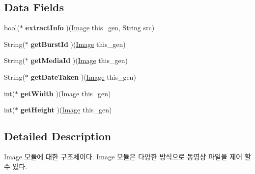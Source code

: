 \subsection*{Data Fields}
\begin{DoxyCompactItemize}
\item 
\hypertarget{struct__Image_abc38422f15a135e8d3d488fd17404a11}{bool($\ast$ {\bfseries extract\-Info} )(\hyperlink{struct__Image}{Image} this\-\_\-gen, String src)}\label{struct__Image_abc38422f15a135e8d3d488fd17404a11}

\item 
\hypertarget{struct__Image_a43ccbbf065326a2647887464f16b7373}{String($\ast$ {\bfseries get\-Burst\-Id} )(\hyperlink{struct__Image}{Image} this\-\_\-gen)}\label{struct__Image_a43ccbbf065326a2647887464f16b7373}

\item 
\hypertarget{struct__Image_a3ebc4a1fcad891955f6bd315dbf79b87}{String($\ast$ {\bfseries get\-Media\-Id} )(\hyperlink{struct__Image}{Image} this\-\_\-gen)}\label{struct__Image_a3ebc4a1fcad891955f6bd315dbf79b87}

\item 
\hypertarget{struct__Image_a170cc9a88ad9e65b2d8725d1370bc946}{String($\ast$ {\bfseries get\-Date\-Taken} )(\hyperlink{struct__Image}{Image} this\-\_\-gen)}\label{struct__Image_a170cc9a88ad9e65b2d8725d1370bc946}

\item 
\hypertarget{struct__Image_ac1af259a21d8c67dab2729dc2ca8e6ab}{int($\ast$ {\bfseries get\-Width} )(\hyperlink{struct__Image}{Image} this\-\_\-gen)}\label{struct__Image_ac1af259a21d8c67dab2729dc2ca8e6ab}

\item 
\hypertarget{struct__Image_a8958794ba1906035ca256305dc103399}{int($\ast$ {\bfseries get\-Height} )(\hyperlink{struct__Image}{Image} this\-\_\-gen)}\label{struct__Image_a8958794ba1906035ca256305dc103399}

\end{DoxyCompactItemize}


\subsection{Detailed Description}
Image 모듈에 대한 구조체이다. Image 모듈은 다양한 방식으로 동영상 파일을 제어 할 수 있다. 

